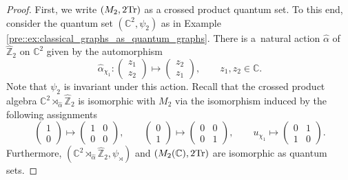 \documentclass{amsart}
\theoremstyle{definition}
\theoremstyle{definition}
\begin{document}
\begin{proof}
First, we write $(M_2,2{\rm Tr})$ as a crossed product quantum set. To this end, consider the quantum set $(\mathbb{C}^2,\psi_2)$ as in Example \ref{pre::ex:classical_graphs_as_quantum_graphs}. There is a~natural action $\hat{\alpha}$ of $\hat{\mathbb{Z}}_2$ on $\mathbb{C}^2$ given by the automorphism
\[
\hat{\alpha}_{\chi_1}:\begin{pmatrix}z_1\\z_2\end{pmatrix}\longmapsto \begin{pmatrix}z_2\\z_1\end{pmatrix},\qquad z_1,z_2\in\mathbb{C}.
\]
Note that $\psi_2$ is invariant under this action. Recall that the crossed product algebra $\mathbb{C}^2\rtimes_{\hat{\alpha}}\hat{\mathbb{Z}}_2$ is isomorphic with $M_2$ via the isomorphism induced by the following assignments
\[
\begin{pmatrix}1\\0\end{pmatrix}\longmapsto \begin{pmatrix}1 & 0\\0 & 0\end{pmatrix},\qquad \begin{pmatrix}0\\1\end{pmatrix}\longmapsto \begin{pmatrix}0 & 0\\ 0 & 1\end{pmatrix},\qquad u_{\chi_1}\longmapsto \begin{pmatrix}0 & 1\\1 & 0\end{pmatrix}.
\]
Furthermore, $(\mathbb{C}^2\rtimes_{\hat{\alpha}}\hat{\mathbb{Z}}_2,\psi_\rtimes)$ and $(M_2(\mathbb{C}),2{\rm Tr})$ are isomorphic as quantum sets.


\end{proof}
\end{document}
